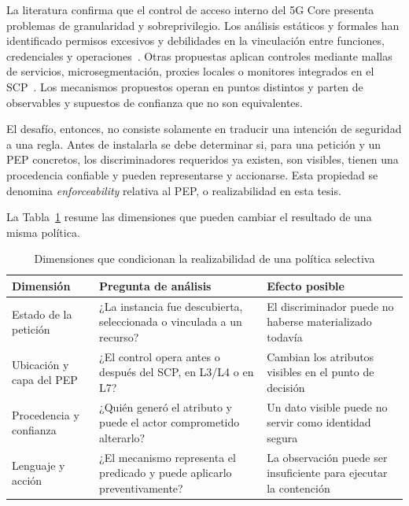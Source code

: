 La literatura confirma que el control de acceso interno del 5G Core presenta problemas de granularidad y sobreprivilegio. Los análisis estáticos y formales han identificado permisos excesivos y debilidades en la vinculación entre funciones, credenciales y operaciones~\cite{E0030,E0066,E0036}. Otras propuestas aplican controles mediante mallas de servicios, microsegmentación, proxies locales o monitores integrados en el SCP~\cite{E0004,E0019,E0045,E0061,E0069}. Los mecanismos propuestos operan en puntos distintos y parten de observables y supuestos de confianza que no son equivalentes.

El desafío, entonces, no consiste solamente en traducir una intención de seguridad a una regla. Antes de instalarla se debe determinar si, para una petición y un PEP concretos, los discriminadores requeridos ya existen, son visibles, tienen una procedencia confiable y pueden representarse y accionarse. Esta propiedad se denomina \textit{enforceability} relativa al PEP, o realizabilidad en esta tesis.

La Tabla~\ref{tab:dimensiones-problema-cap1} resume las dimensiones que pueden cambiar el resultado de una misma política.

\begin{table}[H]
    \centering
    \caption{Dimensiones que condicionan la realizabilidad de una política selectiva}
    \label{tab:dimensiones-problema-cap1}
    \small
    \begin{singlespace}
    \begin{tabularx}{\textwidth}{@{}
        >{\raggedright\arraybackslash}p{3.25cm}
        >{\raggedright\arraybackslash}p{4.15cm}
        >{\raggedright\arraybackslash}X@{}}
        \toprule
        Dimensión & Pregunta de análisis & Efecto posible \\
        \midrule
        Estado de la petición & ¿La instancia fue descubierta, seleccionada o vinculada a un recurso? & El discriminador puede no haberse materializado todavía \\
        Ubicación y capa del PEP & ¿El control opera antes o después del SCP, en L3/L4 o en L7? & Cambian los atributos visibles en el punto de decisión \\
        Procedencia y confianza & ¿Quién generó el atributo y puede el actor comprometido alterarlo? & Un dato visible puede no servir como identidad segura \\
        Lenguaje y acción & ¿El mecanismo representa el predicado y puede aplicarlo preventivamente? & La observación puede ser insuficiente para ejecutar la contención \\
        \bottomrule
    \end{tabularx}
    \end{singlespace}
\end{table}

